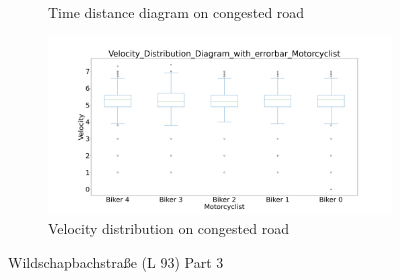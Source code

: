 \begin{figure}[H]
\begin{subfigure}[b]{0.45\textwidth}
		\caption{Time distance diagram on congested road}
	\end{subfigure}
	\hfill
	\begin{subfigure}[b]{0.45\textwidth}
		\centering
		\includegraphics[width=1.0\textwidth]{images/Wildschapbachstrase/Wildschapbachstrase_Velocity_Distribution_Diagram_with_errorbar_congested.png}
		\caption{Velocity distribution on congested road}
	\end{subfigure}
	\caption{Wildschapbachstraße (L 93) Part 3}
\end{figure}

